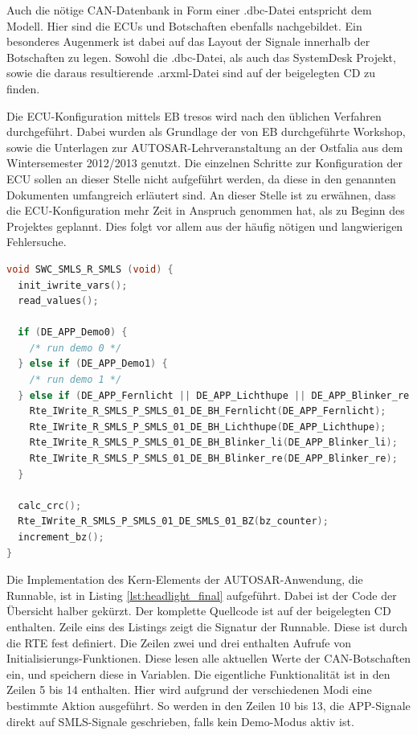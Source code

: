 \documentclass[
  a4paper,					    %
  twoside,
  DIV=calc,     				%
  bibliography=totoc,
  cleardoublepage=empty,
  ngerman,     					%
  final       					%
]{scrbook}
\begin{document}
Auch die nötige CAN-Datenbank in Form einer .dbc-Datei entspricht dem Modell. Hier sind die ECUs und Botschaften ebenfalls nachgebildet. Ein besonderes Augenmerk ist dabei auf das Layout der Signale innerhalb der Botschaften zu legen. Sowohl die .dbc-Datei, als auch das SystemDesk Projekt, sowie die daraus resultierende .arxml-Datei sind auf der beigelegten CD zu finden.

Die ECU-Konfiguration mittels EB tresos wird nach den üblichen Verfahren durchgeführt. Dabei wurden als Grundlage der von EB durchgeführte Workshop, sowie die Unterlagen zur AUTOSAR-Lehrveranstaltung an der Ostfalia aus dem Wintersemester 2012/2013 genutzt. Die einzelnen Schritte zur Konfiguration der ECU sollen an dieser Stelle nicht aufgeführt werden, da diese in den genannten Dokumenten umfangreich erläutert sind. An dieser Stelle ist zu erwähnen, dass die ECU-Konfiguration mehr Zeit in Anspruch genommen hat, als zu Beginn des Projektes geplannt. Dies folgt vor allem aus der häufig nötigen und langwierigen Fehlersuche.

\begin{lstlisting}[frame=single, language=C, basicstyle=\footnotesize, caption={Implementation der Runnable}, label={lst:headlight_final}]
void SWC_SMLS_R_SMLS (void) {
  init_iwrite_vars();
  read_values();

  if (DE_APP_Demo0) {
    /* run demo 0 */
  } else if (DE_APP_Demo1) {
    /* run demo 1 */
  } else if (DE_APP_Fernlicht || DE_APP_Lichthupe || DE_APP_Blinker_re || DE_APP_Blinker_li) {
    Rte_IWrite_R_SMLS_P_SMLS_01_DE_BH_Fernlicht(DE_APP_Fernlicht);
    Rte_IWrite_R_SMLS_P_SMLS_01_DE_BH_Lichthupe(DE_APP_Lichthupe);
    Rte_IWrite_R_SMLS_P_SMLS_01_DE_BH_Blinker_li(DE_APP_Blinker_li);
    Rte_IWrite_R_SMLS_P_SMLS_01_DE_BH_Blinker_re(DE_APP_Blinker_re);	
  }

  calc_crc();
  Rte_IWrite_R_SMLS_P_SMLS_01_DE_SMLS_01_BZ(bz_counter);
  increment_bz();	
}
\end{lstlisting}

Die Implementation des Kern-Elements der AUTOSAR-Anwendung, die Runnable, ist in Listing \ref{lst:headlight_final} aufgeführt. Dabei ist der Code der Übersicht halber gekürzt. Der komplette Quellcode ist auf der beigelegten CD enthalten. Zeile eins des Listings zeigt die Signatur der Runnable. Diese ist durch die RTE fest definiert. Die Zeilen zwei und drei enthalten Aufrufe von Initialisierungs-Funktionen. Diese lesen alle aktuellen Werte der CAN-Botschaften ein, und speichern diese in Variablen. Die eigentliche Funktionalität ist in den Zeilen 5 bis 14 enthalten. Hier wird aufgrund der verschiedenen Modi eine bestimmte Aktion ausgeführt. So werden in den Zeilen 10 bis 13, die APP-Signale direkt auf SMLS-Signale geschrieben, falls kein Demo-Modus aktiv ist.
\end{document}
